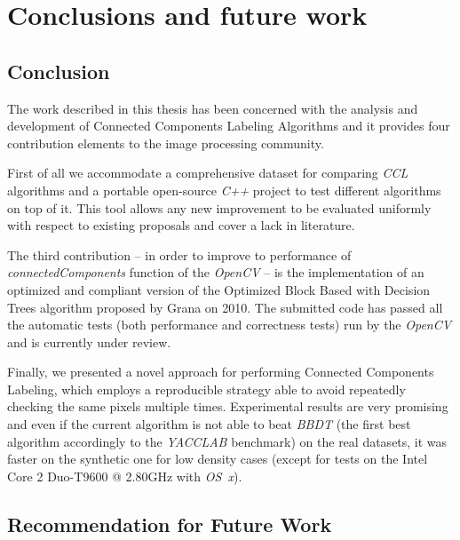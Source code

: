 \chapter{Conclusions and future work}



\section{Conclusion}
\label{sec:conclusion}
The work described in this thesis has been concerned with the analysis and development of Connected Components Labeling Algorithms and it provides four contribution elements to the image processing community. 

First of all we accommodate a comprehensive dataset for comparing \textit{CCL} algorithms and a portable open-source \textit{C++} project to test different algorithms on top of it. This tool allows any new improvement to be evaluated uniformly with respect to existing proposals and cover a lack in literature. 

The third contribution -- in order to improve to performance of \textit{connectedComponents} function of the \textit{OpenCV} -- is the implementation of an optimized and compliant version of the Optimized Block Based with Decision Trees algorithm proposed by Grana \etal on 2010. The submitted code has passed all the automatic tests (both performance and correctness tests) run by the \textit{OpenCV} and is currently under review.

Finally, we presented a novel approach for performing Connected Components Labeling, which employs a reproducible strategy able to avoid repeatedly checking the same pixels multiple times. Experimental results are very promising and even if the current algorithm is not able to beat \textit{BBDT} (the first best algorithm accordingly to the \textit{YACCLAB} benchmark) on the real datasets, it was faster on the synthetic one for low density cases (except for tests on the Intel Core 2 Duo-T9600 @ 2.80GHz with \textit{OS~x}).

\section{Recommendation for Future Work}

